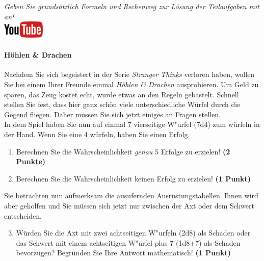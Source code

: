\documentclass[a4paper, 9pt]{scrartcl}\usepackage[]{graphicx}\usepackage[]{xcolor}
\begin{document}
\textit{Geben Sie grunds{\"a}tzlich Formeln und Rechenweg zur L{\"o}sung der
  Teilaufgaben mit an!} \\[1Ex]

\hfill\href{https://youtu.be/8Pb2sKUIMyk}{\includegraphics[width =
  2cm]{img/youtube}} %
\hspace{2Ex}

\paragraph{H{\"o}hlen \& Drachen}



Nachdem Sie sich begeistert in der Serie \textit{Stranger Thinks} verloren
haben, wollen Sie bei einem Ihrer Freunde einmal \textit{H{\"o}hlen \& Drachen}
ausprobieren. Um Geld zu sparen, das Zeug kostet echt, wurde etwas an den
Regeln gebastelt. Schnell stellen Sie fest, dass hier ganz sch{\"o}n viele
unterschiedliche W{\"u}rfel durch die Gegend fliegen. Daher m{\"u}ssen Sie sich
jetzt einiges an Fragen stellen. \\%

In dem Spiel haben Sie nun auf einmal 7 vierseitige W{"u}rfel (7d4) zum w{\"u}rfeln in der Hand. Wenn Sie eine 4 w{\"u}rfeln,
haben Sie einen Erfolg.

\begin{enumerate}
\item Berechnen Sie die Wahrscheinlichkeit \textit{genau}
  5 Erfolge zu erzielen!  \textbf{(2 Punkte)}
\item Berechnen Sie die Wahrscheinlichkeit keinen Erfolg zu erzielen!
  \textbf{(1 Punkt)}
\end{enumerate}

Sie betrachten nun aufmerksam die ausufernden Ausr{\"u}stungstabellen. Ihnen
wird aber geholfen und Sie m{\"u}ssen sich jetzt nur zwischen der Axt oder dem
Schwert entscheiden.

\begin{enumerate}
  \setcounter{enumi}{2}
\item W{\"u}rden Sie die Axt mit zwei achtseitigen W{"u}rfeln (2d8) als Schaden oder
  das Schwert mit einem achtseitigen W{"u}rfel plus 7 (1d8+7) als Schaden bevorzugen?
  Begr{\"u}nden Sie Ihre Antwort mathematisch! \textbf{(1 Punkt)}
\end{enumerate}
\end{document}
